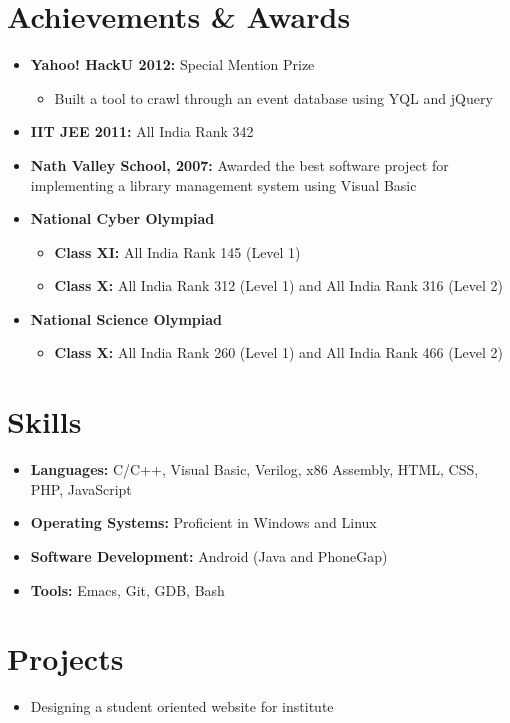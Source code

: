 \documentclass[letterpaper,11pt]{resume}
\begin{document}
\section{Achievements \& Awards}
\begin{itemize}
  \item {\bf Yahoo! HackU 2012:} Special Mention Prize
    \begin{itemize}
     \item Built a tool to crawl through an event database using YQL and jQuery
    \end{itemize}
  \item {\bf IIT JEE 2011: }All India Rank 342 
  \item {\bf Nath Valley School, 2007:} Awarded the best software project for implementing a library management system using Visual Basic
  \item {\bf National Cyber Olympiad} 
    \begin{itemize}
     \item {\bf Class XI:} All India Rank 145 (Level 1)
     \item {\bf Class X:} All India Rank 312 (Level 1) and All India Rank 316 (Level 2) 
    \end{itemize}
  \item {\bf National Science Olympiad}
    \begin{itemize}
      \item {\bf Class X:} All India Rank 260 (Level 1) and All India Rank 466 (Level 2) 
    \end{itemize}
  \end{itemize}  %
\section{Skills}
\begin{itemize}
  \item {\bf Languages:} C/C++, Visual Basic, Verilog, x86 Assembly, HTML, CSS, PHP, JavaScript	
  \item {\bf Operating Systems:} Proficient in Windows and Linux
  \item {\bf Software Development:} Android (Java and PhoneGap)
  \item {\bf Tools:} Emacs, Git, GDB, Bash
\end{itemize} %
\pagebreak
\section{Projects}
\begin{itemize}
 \item Designing a student oriented website for institute
\end{itemize}
\end{document}
